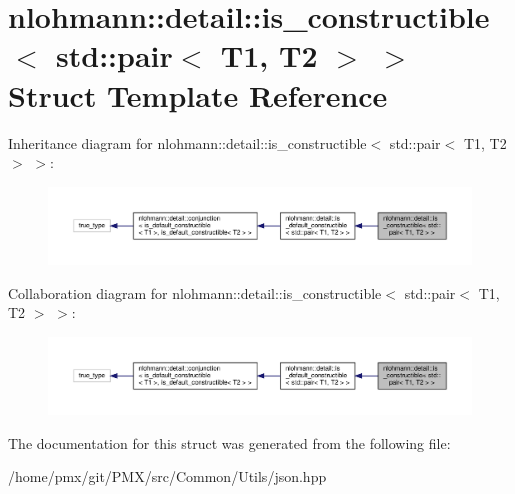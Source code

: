\hypertarget{structnlohmann_1_1detail_1_1is__constructible_3_01std_1_1pair_3_01T1_00_01T2_01_4_01_4}{}\section{nlohmann\+:\+:detail\+:\+:is\+\_\+constructible$<$ std\+:\+:pair$<$ T1, T2 $>$ $>$ Struct Template Reference}
\label{structnlohmann_1_1detail_1_1is__constructible_3_01std_1_1pair_3_01T1_00_01T2_01_4_01_4}


Inheritance diagram for nlohmann\+:\+:detail\+:\+:is\+\_\+constructible$<$ std\+:\+:pair$<$ T1, T2 $>$ $>$\+:
\nopagebreak
\begin{figure}[H]
\begin{center}
\leavevmode
\includegraphics[width=350pt]{structnlohmann_1_1detail_1_1is__constructible_3_01std_1_1pair_3_01T1_00_01T2_01_4_01_4__inherit__graph}
\end{center}
\end{figure}


Collaboration diagram for nlohmann\+:\+:detail\+:\+:is\+\_\+constructible$<$ std\+:\+:pair$<$ T1, T2 $>$ $>$\+:
\nopagebreak
\begin{figure}[H]
\begin{center}
\leavevmode
\includegraphics[width=350pt]{structnlohmann_1_1detail_1_1is__constructible_3_01std_1_1pair_3_01T1_00_01T2_01_4_01_4__coll__graph}
\end{center}
\end{figure}


The documentation for this struct was generated from the following file\+:\begin{DoxyCompactItemize}
\item 
/home/pmx/git/\+P\+M\+X/src/\+Common/\+Utils/json.\+hpp\end{DoxyCompactItemize}
